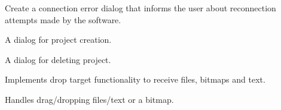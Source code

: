 \documentclass[letterpaper,10pt,english]{sphinxmanual}
\begin{document}

\begin{fulllineitems}
\label{wos:wos.ConnectionErrorDialog}
Create a connection error dialog that informs the user about reconnection
attempts made by the software.

\end{fulllineitems}


\begin{fulllineitems}
\label{wos:wos.CreateProjectDialog}
A dialog for project creation.

\end{fulllineitems}


\begin{fulllineitems}
\label{wos:wos.DeleteProjectDialog}
A dialog for deleting project.

\end{fulllineitems}


\begin{fulllineitems}
\label{wos:wos.DropTarget}
Implements drop target functionality to receive files, bitmaps and text.

\begin{fulllineitems}
\label{wos:wos.DropTarget.OnData}
Handles drag/dropping files/text or a bitmap.

\end{fulllineitems}


\end{fulllineitems}

\end{document}
